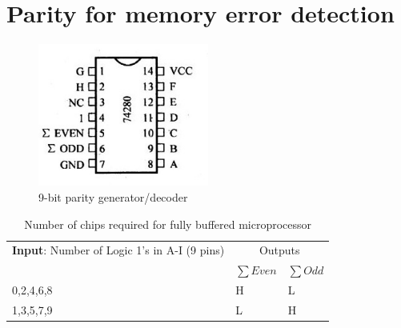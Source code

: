 \section{Parity for memory error detection}

\begin{figure}[h!]
  \centering
  \includegraphics[width = 0.5\textwidth]{./figures/74LS280.jpeg}
  \caption{9-bit parity generator/decoder}
  \label{}
\end{figure}
\begin{table}[h!]
\centering
\begin{tabular}{ |p{6cm}|p{2cm}|p{2cm}| }
\hline
\textbf{Input}: Number of Logic 1's in A-I (9 pins)& \multicolumn{2}{|c|}{Outputs}\\

& $\sum Even$ & $\sum Odd$ \\
\hline
0,2,4,6,8   & H & L\\
1,3,5,7,9   & L & H\\
\hline
\end{tabular}

\caption{Number of chips required for fully buffered microprocessor}
\label{table:8}
\end{table}

